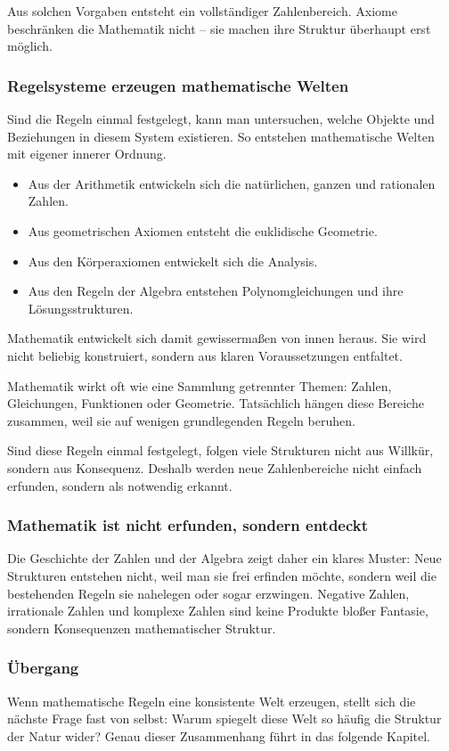 Aus solchen Vorgaben entsteht ein vollständiger Zahlenbereich.
Axiome beschränken die Mathematik nicht --
sie machen ihre Struktur überhaupt erst möglich.

\subsubsection*{Regelsysteme erzeugen mathematische Welten}
Sind die Regeln einmal festgelegt,
kann man untersuchen,
welche Objekte und Beziehungen in diesem System existieren.
So entstehen mathematische Welten mit eigener innerer Ordnung.

\begin{itemize}
	\item Aus der Arithmetik entwickeln sich die natürlichen, ganzen und rationalen Zahlen.
	\item Aus geometrischen Axiomen entsteht die euklidische Geometrie.
	\item Aus den Körperaxiomen entwickelt sich die Analysis.
	\item Aus den Regeln der Algebra entstehen Polynomgleichungen und ihre Lösungsstrukturen.
\end{itemize}

Mathematik entwickelt sich damit gewissermaßen von innen heraus.
Sie wird nicht beliebig konstruiert,
sondern aus klaren Voraussetzungen entfaltet.

\begin{DidacticBox}
	\label{box:regeln}
	Mathematik wirkt oft wie eine Sammlung getrennter Themen:
	Zahlen, Gleichungen, Funktionen oder Geometrie.
	Tatsächlich hängen diese Bereiche zusammen,
	weil sie auf wenigen grundlegenden Regeln beruhen.
	
	Sind diese Regeln einmal festgelegt,
	folgen viele Strukturen nicht aus Willkür,
	sondern aus Konsequenz.
	Deshalb werden neue Zahlenbereiche nicht einfach erfunden,
	sondern als notwendig erkannt.
\end{DidacticBox}

\subsubsection*{Mathematik ist nicht erfunden, sondern entdeckt}
Die Geschichte der Zahlen und der Algebra
zeigt daher ein klares Muster:
Neue Strukturen entstehen nicht,
weil man sie frei erfinden möchte,
sondern weil die bestehenden Regeln sie nahelegen oder sogar erzwingen.
Negative Zahlen, irrationale Zahlen und komplexe Zahlen
sind keine Produkte bloßer Fantasie,
sondern Konsequenzen mathematischer Struktur.

\subsubsection*{Übergang}
Wenn mathematische Regeln eine konsistente Welt erzeugen,
stellt sich die nächste Frage fast von selbst:
Warum spiegelt diese Welt so häufig die Struktur der Natur wider?
Genau dieser Zusammenhang führt in das folgende Kapitel.